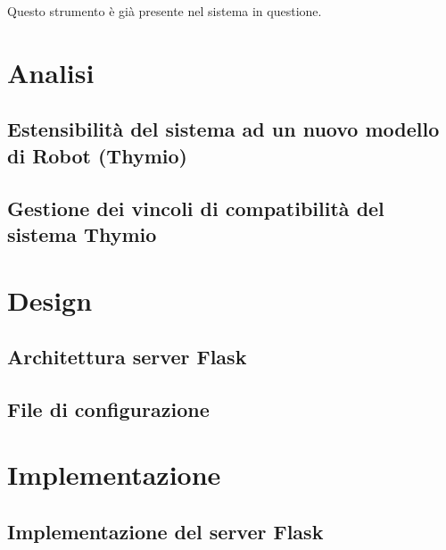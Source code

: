 \documentclass[12pt,a4paper,openright,twoside]{book}
\begin{document}
Questo strumento è già presente nel sistema in questione.

\chapter{Analisi}
\label{chap:analisi}

\section{Estensibilità del sistema ad un nuovo modello di Robot (Thymio)}

\section{Gestione dei vincoli di compatibilità del sistema Thymio}


\chapter{Design}
\label{chap:design}

\section{Architettura server Flask}

\section{File di configurazione}

\chapter{Implementazione}
\label{chap:implementazione}

\section{Implementazione del server Flask}
\end{document}
